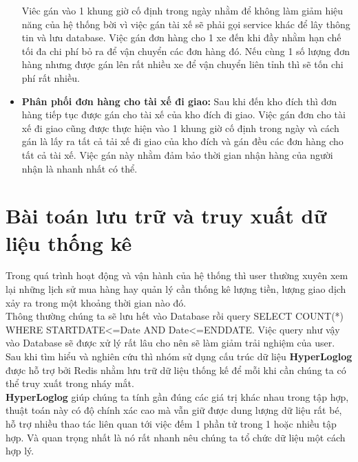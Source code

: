 \begin{itemize}
                Viêc gán vào 1 khung giờ cố định trong ngày nhằm để không làm giảm hiệu năng của hệ thống bời vì việc gán tài xế sẽ phải gọi service khác để lây thông tin và lưu database. Việc gán đơn hàng cho 1 xe đến khi đầy nhằm hạn chế tối đa chi phí bỏ ra để vận chuyển các đơn hàng đó. Nếu cùng 1 số lượng đơn hàng nhưng được gán lên rất nhiều xe để vận chuyển liên tỉnh thì sẽ tốn chi phí rất nhiều.
                
                \item \textbf{Phân phối đơn hàng cho tài xế  đi giao:} Sau khi đến kho đích thì đơn hàng tiếp tục được gán cho tài xế của kho đích đi giao. Việc gán đơn cho tài xế đi giao cũng được thực hiện vào 1 khung giờ cố định trong ngày và cách gán là lấy ra tất cả tải xế đi giao của kho đích và gán đều các đơn hàng cho tất cả tài xế. Việc gán này nhằm đảm bảo thời gian nhận hàng của người nhận là nhanh nhất có thể.
                
            \end{itemize}
            
            
            \section{Bài toán lưu trữ và truy xuất dữ liệu thống kê}
                Trong quá trình hoạt động và vận hành của hệ thống thì user thường xuyên xem lại những lịch sử mua hàng hay quản lý cần thống kê lượng tiền, lượng giao dịch xảy ra trong một khoảng thời gian nào đó.\\
                Thông thường chúng ta sẽ lưu hết vào Database rồi query SELECT COUNT(*) WHERE STARTDATE<=Date AND Date<=ENDDATE. Việc query như vậy vào Database sẽ được xử lý rất lâu cho nên sẽ làm giảm trải nghiệm của user.\\
                Sau khi tìm hiểu và nghiên cứu thì nhóm sử dụng cấu trúc dữ liệu \textbf{HyperLoglog} được hỗ trợ bởi Redis nhằm lưu trữ dữ liệu thống kế để mỗi khi cần chúng ta có thể truy xuất trong nháy mắt.\\
                \textbf{HyperLoglog} giúp chúng ta tính gần đúng các giá trị khác nhau trong tập hợp, thuật toán này có độ chính xác cao mà vẫn giữ được dung lượng dữ liệu rất bé, hỗ trợ nhiều thao tác liên quan tới việc đếm 1 phần tử trong 1 hoặc nhiều tập hợp. Và quan trọng nhất là nó rất nhanh nêu chúng ta tổ chức dữ liệu một cách hợp lý.\\
                
